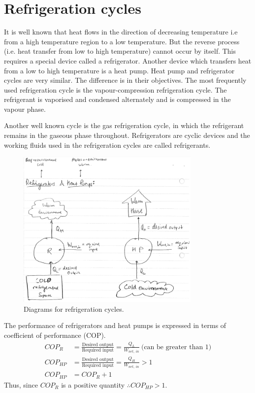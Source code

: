 \documentclass[class=report, crop=false, 12pt,a4paper]{standalone}
\begin{document}
\section{Refrigeration cycles}
It is well known that heat flows in the direction of decreasing temperature i.e from a high temperature region to a low temperature. But the reverse process (i.e. heat transfer from low to high temperature) cannot occur by itself. This requires a special device called a refrigerator. Another device which transfers heat from a low to high temperature is a heat pump. Heat pump and refrigerator cycles are very similar. The difference is in their objectives. The most frequently used refrigeration cycle is the vapour-compression refrigeration cycle. The refrigerant is vaporised and condensed alternately and is compressed in the vapour phase. 

Another well known cycle is the gas refrigeration cycle, in which the refrigerant remains in the gaseous phase throughout. Refrigerators are cyclic devices and the working fluids used in the refrigeration cycles are called refrigerants.
\begin{figure}
  \centering
  \includegraphics[width = 0.8\textwidth]{../img/RefigerationCycles}
  \caption{Diagrams for refrigeration cycles.}
\end{figure}
The performance of refrigerators and heat pumps is expressed in terms of coefficient of performance (COP).
\begin{align}
  COP_R &= \frac{\textrm{Desired output}}{\textrm{Required input}} = \frac{Q_L}{W_{net, \ in}} \ \textrm{(can be greater than 1)}\\
  COP_{HP} &= \frac{\textrm{Desired output}}{\textrm{Required input}} = \frac{Q_H}{W_{net, \ in}} > 1\\
  COP_{HP} &= COP_R +1
\end{align}
Thus, since $COP_R$ is a positive quantity $\therefore COP_{HP} >1$.
\end{document}
